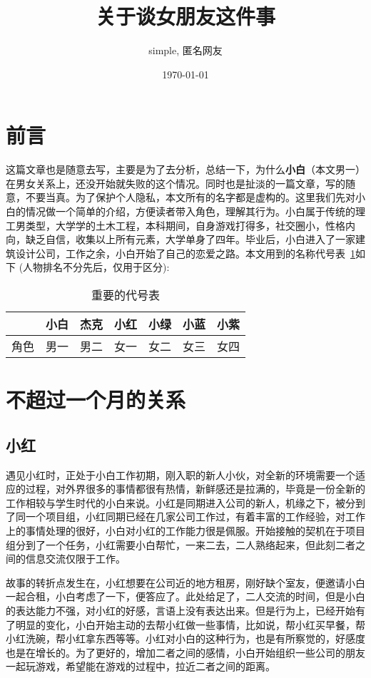 \documentclass{article}
\title{\textbf{关于谈女朋友这件事}}
\author{simple, 匿名网友}
\date{\today}
\begin{document}
\maketitle

\section{前言}

这篇文章也是随意去写，主要是为了去分析，总结一下，为什么\textbf{小白}（本文男一）在男女关系上，还没开始就失败的这个情况。同时也是扯淡的一篇文章，写的随意，不要当真。为了保护个人隐私，本文所有的名字都是虚构的。这里我们先对小白的情况做一个简单的介绍，方便读者带入角色，理解其行为。小白属于传统的理工男类型，大学学的土木工程，本科期间，自身游戏打得多，社交圈小，性格内向，缺乏自信，收集以上所有元素，大学单身了四年。毕业后，小白进入了一家建筑设计公司，工作之余，小白开始了自己的恋爱之路。本文用到的名称代号表~\ref{name_replace}如下 (人物排名不分先后，仅用于区分):


\begin{table}[h]
    \caption{重要的代号表}
    \label{name_replace}
    \centering
    \begin{tabular}{ccccccc}
        \toprule
        & 小白 & 杰克 & 小红 & 小绿 & 小蓝 & 小紫\\
        \midrule
        角色 & 男一 & 男二 & 女一 & 女二 & 女三 & 女四\\
        \bottomrule
    \end{tabular}
\end{table}


\section{不超过一个月的关系}
\subsection{小红}
遇见小红时，正处于小白工作初期，刚入职的新人小伙，对全新的环境需要一个适应的过程，对外界很多的事情都很有热情，新鲜感还是拉满的，毕竟是一份全新的工作相较与学生时代的小白来说。小红是同期进入公司的新人，机缘之下，被分到了同一个项目组，小红同期已经在几家公司工作过，有着丰富的工作经验，对工作上的事情处理的很好，小白对小红的工作能力很是佩服。开始接触的契机在于项目组分到了一个任务，小红需要小白帮忙，一来二去，二人熟络起来，但此刻二者之间的信息交流仅限于工作。

故事的转折点发生在，小红想要在公司近的地方租房，刚好缺个室友，便邀请小白一起合租，小白考虑了一下，便答应了。此处给足了，二人交流的时间，但是小白的表达能力不强，对小红的好感，言语上没有表达出来。但是行为上，已经开始有了明显的变化，小白开始主动的去帮小红做一些事情，比如说，帮小红买早餐，帮小红洗碗，帮小红拿东西等等。小红对小白的这种行为，也是有所察觉的，好感度也是在增长的。为了更好的，增加二者之间的感情，小白开始组织一些公司的朋友一起玩游戏，希望能在游戏的过程中，拉近二者之间的距离。
\end{document}
